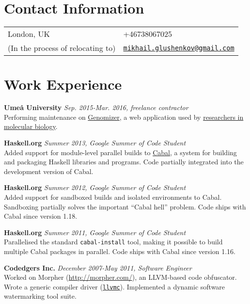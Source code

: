 \documentclass[margin,line]{res}
\begin{document}

\begin{resume}
\section{\sc Contact Information}
\vspace{.05in}
\begin{tabular}{@{}p{2in}p{4in}}
London, UK&
+46738067025\\
(In the process of relocating to)&
\href{mailto:mikhail.glushenkov@gmail.com}
{\texttt{mikhail.glushenkov@gmail.com}}\\
\end{tabular}

\section{\sc Work Experience}

{\bf Umeå University} \hfill {\it Sep. 2015-Mar. 2016, freelance contractor}\\
Performing maintenance on \href{https://github.com/genomizer}{Genomizer}, a web
application used by \href{http://www.epicon.nu}{researchers in molecular biology}.

{\bf Haskell.org} \hfill {\it Summer 2013, Google Summer of Code Student}\\
Added support for module-level parallel builds to
\href{http://haskell.org/cabal}{Cabal}, a system for building and packaging
Haskell libraries and programs. Code partially integrated into the development
version of Cabal.

{\bf Haskell.org} \hfill {\it Summer 2012, Google Summer of Code Student}\\
Added support for sandboxed builds and isolated environments to
Cabal. Sandboxing partially solves the important ``Cabal hell'' problem. Code
ships with Cabal since version 1.18.

{\bf Haskell.org} \hfill {\it Summer 2011, Google Summer of Code Student}\\
Parallelised the standard \texttt{cabal-install} tool, making it possible to
build multiple Cabal packages in parallel. Code ships with Cabal since version
1.16.

{\bf Codedgers Inc.} \hfill {\it December 2007-May 2011, Software Engineer}\\
Worked on Morpher (\url{http://morpher.com/}), an LLVM-based code
obfuscator. Wrote a generic compiler driver
(\href{http://llvm.org/releases/2.9/docs/CompilerDriver.html}{\texttt{llvmc}}). Implemented
a dynamic software watermarking tool suite.


\end{resume}
\end{document}
